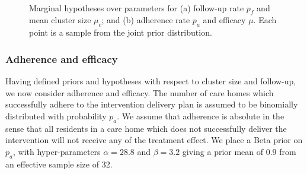 \documentclass[AMA,STIX1COL]{WileyNJD-v2}
\begin{document}
\begin{figure}
   \centering
   \quad
   \\
   \caption{Marginal hypotheses over parameters for (a) follow-up rate $p_{f}$ and mean cluster size $\mu_{c}$; and (b) adherence rate $p_{a}$ and efficacy $\mu$. Each point is a sample from the joint prior distribution.}
   \label{fig:hyps}
\end{figure}

\subsubsection{Adherence and efficacy}

Having defined priors and hypotheses with respect to cluster size and follow-up, we now consider adherence and efficacy. The number of care homes which successfully adhere to the intervention delivery plan is assumed to be binomially distributed with probability $p_{a}$. We assume that adherence is absolute in the sense that all residents in a care home which does not successfully deliver the intervention will not receive any of the treatment effect. We place a Beta prior on $p_{a}$, with hyper-parameters $\alpha = 28.8$ and $\beta = 3.2$ giving a prior mean of 0.9 from an effective sample size of 32.
\end{document}
